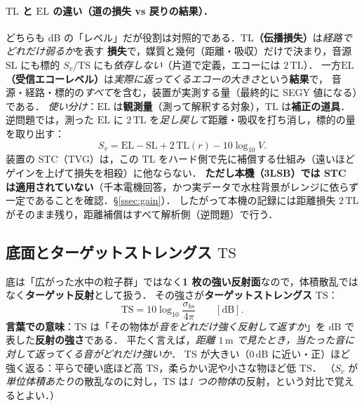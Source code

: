 \documentclass[11pt]{ltjsarticle}
\newcommand{\unit}[1]{\,\mathrm{#1}}
\begin{document}
\paragraph{$\mathrm{TL}$ と $\mathrm{EL}$ の違い（道の損失 vs 戻りの結果）．}
どちらも dB の「レベル」だが役割は対照的である．\textbf{$\mathrm{TL}$（伝播損失）}は\emph{経路でどれだけ弱るか}を表す
\textbf{損失}で，媒質と幾何（距離・吸収）だけで決まり，音源 $\mathrm{SL}$ にも標的 $S_v/\mathrm{TS}$ にも\emph{依存しない}（片道で定義，エコーには $2\,\mathrm{TL}$）．
一方\textbf{$\mathrm{EL}$（受信エコーレベル）}は\emph{実際に返ってくるエコーの大きさ}という\textbf{結果}で，
音源・経路・標的の\emph{すべて}を含む，装置が実測する量（最終的に SEGY 値になる）である．
\emph{使い分け}：$\mathrm{EL}$ は\textbf{観測量}（測って解釈する対象），$\mathrm{TL}$ は\textbf{補正の道具}．
逆問題では，測った $\mathrm{EL}$ に $2\,\mathrm{TL}$ を\emph{足し戻して}距離・吸収を打ち消し，標的の量を取り出す：
\begin{equation}
S_v=\mathrm{EL}-\mathrm{SL}+2\,\mathrm{TL}(r)-10\log_{10}V .
\end{equation}
装置の STC（TVG）は，この $\mathrm{TL}$ をハード側で先に補償する仕組み（遠いほどゲインを上げて損失を相殺）に他ならない．%
\textbf{ただし本機（3LSB）では STC は適用されていない}（千本電機回答，かつ実データで水柱背景がレンジに依らず一定であることを確認．\S\ref{ssec:gain}）．%
したがって本機の記録には距離損失 $2\,\mathrm{TL}$ がそのまま残り，距離補償はすべて解析側（逆問題）で行う．

\subsection{底面とターゲットストレングス $\mathrm{TS}$}
底は「広がった水中の粒子群」ではなく\textbf{1 枚の強い反射面}なので，体積散乱ではなく\textbf{ターゲット反射}として扱う．
その強さが\textbf{ターゲットストレングス} $\mathrm{TS}$：
\begin{equation}
\mathrm{TS}=10\log_{10}\frac{\sigma_{bs}}{4\pi}\qquad[\mathrm{dB}].
\end{equation}
\textbf{言葉での意味}：$\mathrm{TS}$ は「その物体が\emph{音をどれだけ強く反射して返すか}」を dB で表した\textbf{反射の強さ}である．
平たく言えば，\emph{距離 $1\unit{m}$ で見たとき，当たった音に対して返ってくる音がどれだけ強いか}．
$\mathrm{TS}$ が大きい（$0\unit{dB}$ に近い・正）ほど強く返る：平らで硬い底ほど高 $\mathrm{TS}$，柔らかい泥や小さな物ほど低 $\mathrm{TS}$．
（$S_v$ が\emph{単位体積あたり}の散乱なのに対し，$\mathrm{TS}$ は\emph{1 つの物体}の反射，という対比で覚えるとよい．）
\end{document}
